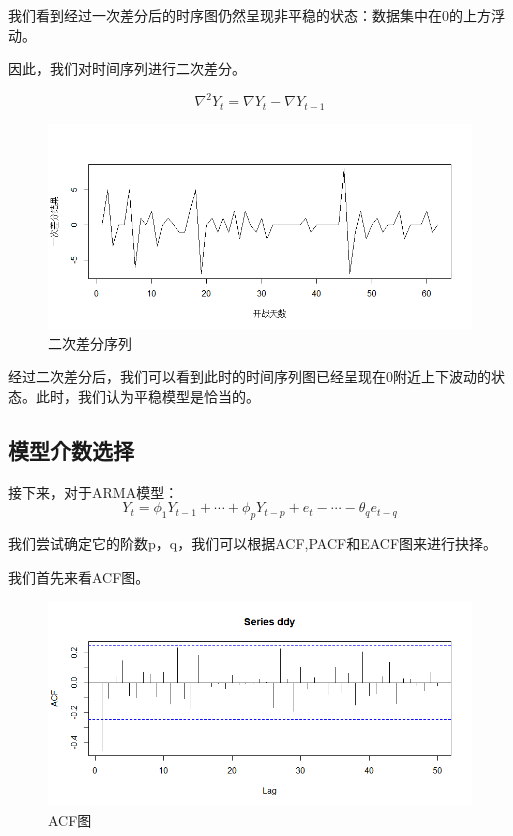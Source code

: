 \documentclass{article}
\begin{document}
	我们看到经过一次差分后的时序图仍然呈现非平稳的状态：数据集中在0的上方浮动。
	
	因此，我们对时间序列进行二次差分。
	
	\begin{equation}
	\nabla^{2}Y_t=\nabla Y_t-\nabla Y_{t-1}
	\end{equation}
	
	
	\begin{figure}[H]
		\centering
		\includegraphics[width=.9\textwidth]{Rplot03.png}
		\caption{二次差分序列}
	\end{figure}
	
	经过二次差分后，我们可以看到此时的时间序列图已经呈现在0附近上下波动的状态。此时，我们认为平稳模型是恰当的。
	
	\subsection{模型介数选择}
	
	接下来，对于ARMA模型：
	\begin{equation}
		Y_t=\phi _1Y_{t-1}+\cdots +\phi _pY_{t-p}+e_t-\cdots -\theta _qe_{t-q}
	\end{equation}
	
	
	我们尝试确定它的阶数p，q，我们可以根据ACF,PACF和EACF图来进行抉择。
	
	我们首先来看ACF图。
	
	
		\begin{figure}[H]
		\centering
		\includegraphics[width=.9\textwidth]{Rplot04.png}
		\caption{ACF图}
	\end{figure}
\end{document}
